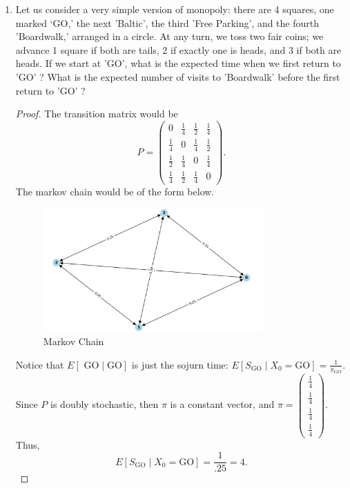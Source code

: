\documentclass[a4paper]{article}
\begin{document}
\begin{enumerate}
\begin{proof}
\begin{align*}
                                                                    &= P_{b,d} P_{a,b} \pi_{a}  
                                                                  .\end{align*}
    The probability matrix $P_{Y_n} ((b,c),(a,b)) = P_{b,c} P_{a,b}$ and the stationary distribution is $\pi = P_{b,d} P_{a,b} \pi_{a}$.
  \end{proof}
  \item Let us consider a very simple version of monopoly: there are 4 squares, one marked ‘GO,’ the
next ’Baltic’, the third ’Free Parking’, and the fourth ’Boardwalk,’ arranged in a circle. At any
turn, we toss two fair coins; we advance 1 square if both are tails, 2 if exactly one is heads, and
3 if both are heads. If we start at ’GO’, what is the expected time when we first return to ’GO’ ?
What is the expected number of visits to ’Boardwalk’ before the first return to ’GO’ ?

\noindent\hrulefill

\begin{proof}
  The transition matrix would be 
  \[
  P = \begin{pmatrix} 
    0 & \frac{1}{4} & \frac{1}{2} & \frac{1}{4} \\
    \frac{1}{4} & 0 & \frac{1}{4} & \frac{1}{2} \\ 
    \frac{1}{2} & \frac{1}{4} & 0 & \frac{1}{4} \\
    \frac{1}{4} & \frac{1}{2} & \frac{1}{4} & 0 
  \end{pmatrix} 
  .\] 
  The markov chain would be of the form below.

\begin{figure}[H]
  \centering
  \includegraphics[width=0.8\textwidth]{assets/hw8_problem2.png}
  \caption{Markov Chain}
  \label{fig:hw8_problem2}
\end{figure}
Notice that $E[\text{ GO} \mid  \text{GO}]$ is just the sojurn time: $E[S_{\text{GO}} \mid X_0 = \text{GO}] = \frac{1}{\pi_{\text{GO}}}$. \\

Since $P$ is doubly stochastic, then $\pi$ is a constant vector, and $\pi = \begin{pmatrix} \frac{1}{4}\\ \frac{1}{4}\\ \frac{1}{4} \\ \frac{1}{4} \end{pmatrix}$. Thus, 
 \[
E[S_{\text{GO}} \mid X_0 = \text{GO}] = \frac{1}{.25} = 4 
.\] 


\end{proof}
\end{enumerate}
\end{document}
